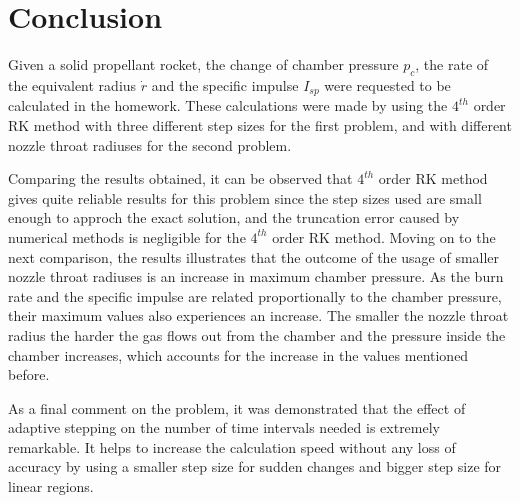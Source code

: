 \documentclass[letterpaper,12pt]{article}
\begin{document}
\newpage

\section{Conclusion}

Given a solid propellant rocket, the change of chamber pressure $p_c$,
the rate of the equivalent radius $\dot{r}$ and the specific impulse $I_{sp}$ were
requested to be calculated in the homework. These calculations were
made by using the $4^{th}$ order RK method with three different step sizes for the first
problem, and with different nozzle throat radiuses for the second problem.

Comparing the results obtained, it can be observed that $4^{th}$ order RK method gives
quite reliable results for this problem since the step sizes used are small
enough to approch the exact solution, and the truncation error caused by numerical
methods is negligible for the $4^{th}$ order RK method. Moving on to the next comparison,
the results illustrates that the outcome of the usage of smaller nozzle throat radiuses
is an increase in maximum chamber pressure. As the burn rate and the specific impulse
are related proportionally to the chamber pressure, their maximum values also experiences
an increase. The smaller the nozzle throat radius the harder the gas flows out from the chamber and
the pressure inside the chamber increases, which accounts for the increase in the values
mentioned before.

As a final comment on the problem, it was demonstrated that the effect of adaptive stepping
on the number of time intervals needed is extremely remarkable. It helps to increase
the calculation speed without any loss of accuracy by using a smaller step size for
sudden changes and bigger step size for linear regions.

\end{document}
